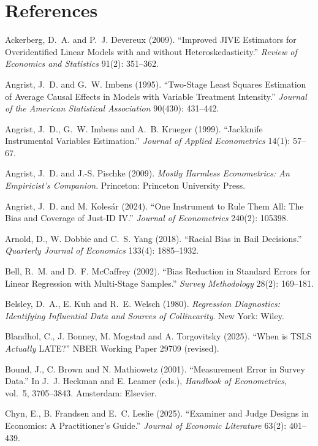 \documentclass[11pt]{article}
\begin{document}
\section*{References}
\begin{description}\setlength{\itemsep}{0pt}\small\sloppy
  \item Ackerberg, D.~A. and P.~J. Devereux (2009). ``Improved JIVE Estimators for Overidentified Linear Models with and without Heteroskedasticity.'' \emph{Review of Economics and Statistics} 91(2): 351--362.
  \item Angrist, J.~D. and G.~W. Imbens (1995). ``Two-Stage Least Squares Estimation of Average Causal Effects in Models with Variable Treatment Intensity.'' \emph{Journal of the American Statistical Association} 90(430): 431--442.
  \item Angrist, J.~D., G.~W. Imbens and A.~B. Krueger (1999). ``Jackknife Instrumental Variables Estimation.'' \emph{Journal of Applied Econometrics} 14(1): 57--67.
  \item Angrist, J.~D. and J.-S. Pischke (2009). \emph{Mostly Harmless Econometrics: An Empiricist's Companion}. Princeton: Princeton University Press.
  \item Angrist, J.~D. and M. Kolesár (2024). ``One Instrument to Rule Them All: The Bias and Coverage of Just-ID IV.'' \emph{Journal of Econometrics} 240(2): 105398.
  \item Arnold, D., W. Dobbie and C.~S. Yang (2018). ``Racial Bias in Bail Decisions.'' \emph{Quarterly Journal of Economics} 133(4): 1885--1932.
  \item Bell, R.~M. and D.~F. McCaffrey (2002). ``Bias Reduction in Standard Errors for Linear Regression with Multi-Stage Samples.'' \emph{Survey Methodology} 28(2): 169--181.
  \item Belsley, D.~A., E. Kuh and R.~E. Welsch (1980). \emph{Regression Diagnostics: Identifying Influential Data and Sources of Collinearity}. New York: Wiley.
  \item Blandhol, C., J. Bonney, M. Mogstad and A. Torgovitsky (2025). ``When is TSLS \emph{Actually} LATE?'' NBER Working Paper 29709 (revised).
  \item Bound, J., C. Brown and N. Mathiowetz (2001). ``Measurement Error in Survey Data.'' In J.~J. Heckman and E. Leamer (eds.), \emph{Handbook of Econometrics}, vol.~5, 3705--3843. Amsterdam: Elsevier.
  \item Chyn, E., B. Frandsen and E.~C. Leslie (2025). ``Examiner and Judge Designs in Economics: A Practitioner's Guide.'' \emph{Journal of Economic Literature} 63(2): 401--439.

\end{description}
\end{document}
